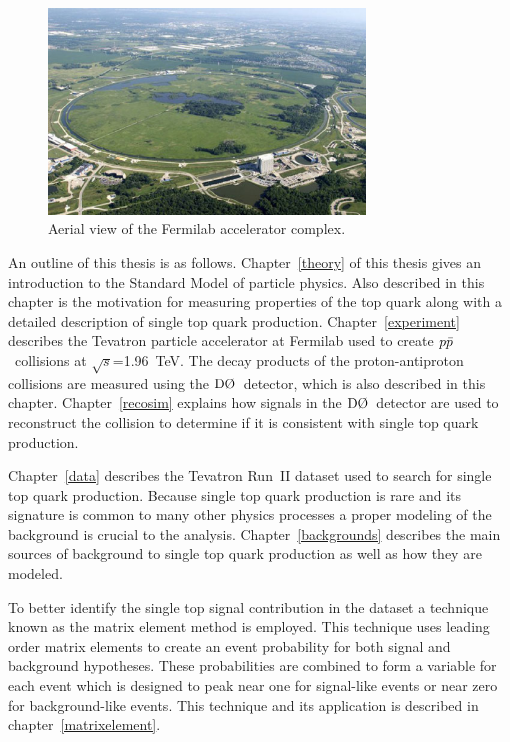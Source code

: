 \begin{figure}[!h!tbp]
\begin{center}
\includegraphics[width=0.75\textwidth]{eps/Tevatron/TevatronArial.eps}
\end{center}
\vspace{-0.1in}
\caption{Aerial view of the Fermilab accelerator complex. }
\label{Fermilab}
\end{figure}

An outline of this thesis is as follows. Chapter~\ref{theory} of this thesis gives an introduction to the Standard Model of particle physics. Also described in this chapter is the motivation for measuring properties of the top quark along with a detailed description of single top quark production. Chapter~\ref{experiment} describes the Tevatron particle accelerator at Fermilab used to create $\mbox{$p\bar{p}$}$~collisions at $\sqrt{s}$=1.96~TeV. The decay products of the proton-antiproton collisions are measured using the $\dzero$~detector, which is also described in this chapter. Chapter~\ref{recosim} explains how signals in the $\dzero$~detector are used to reconstruct the collision to determine if it is consistent with single top quark production.

Chapter~\ref{data} describes the Tevatron Run~II dataset used to search for single top quark production. Because single top quark production is rare and its signature is common to many other physics processes a proper modeling of the background is crucial to the analysis. Chapter~\ref{backgrounds} describes the main sources of background to single top quark production as well as how they are modeled.

To better identify the single top signal contribution in the dataset a technique known as the matrix element method is employed. This technique uses leading order matrix elements to create an event probability for both signal and background hypotheses. These probabilities are combined to form a variable for each event which is designed to peak near one for signal-like events or near zero for background-like events. This technique and its application is described in chapter~\ref{matrixelement}.

